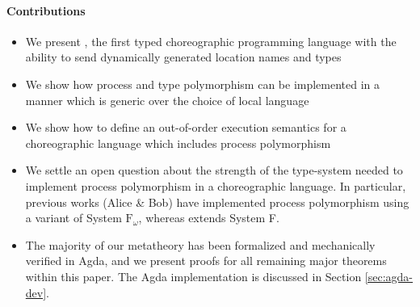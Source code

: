 \paragraph{Contributions}
\begin{itemize}
	\item We present \langname, the first typed choreographic programming language with the ability to send dynamically generated location names and types 
	\item We show how process  and type polymorphism can be implemented in a manner which is generic over the choice of local language
	\item We show how to define an out-of-order execution semantics for a choreographic language which includes process polymorphism
	\item We settle an open question about the strength of the type-system needed to implement process polymorphism in a choreographic language.
  In particular, previous works (Alice \& Bob) have implemented process polymorphism using a variant of System $\text{F}_\omega$, whereas \langname extends System F.
	\item The majority of our metatheory has been formalized and mechanically verified in Agda, and we present proofs for all remaining major theorems within this paper.
  The Agda implementation is discussed in Section \ref{sec:agda-dev}.
\end{itemize}

